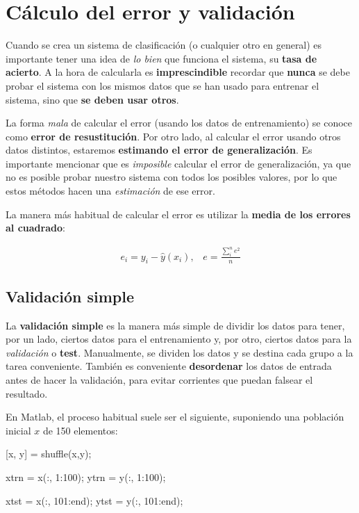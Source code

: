 \documentclass[11pt]{scrartcl}
\begin{document}
\section{Cálculo del error y validación}

Cuando se crea un sistema de clasificación (o cualquier otro en general) es
importante tener una idea de \textit{lo bien} que funciona el sistema, su
\textbf{tasa de acierto}. A la hora de calcularla es \textbf{imprescindible}
recordar que \textbf{nunca} se debe probar el sistema con los mismos datos que
se han usado para entrenar el sistema, sino que \textbf{se deben usar otros}.

La forma \textit{mala} de calcular el error (usando los datos de entrenamiento)
se conoce como \textbf{error de resustitución}. Por otro lado, al calcular el
error usando otros datos distintos, estaremos \textbf{estimando el error de
  generalización}. Es importante mencionar que es \textit{imposible} calcular el
error de generalización, ya que no es posible probar nuestro sistema con todos
los posibles valores, por lo que estos métodos hacen una \textit{estimación} de
ese error.

La manera más habitual de calcular el error es utilizar la \textbf{media de los errores
al cuadrado}:

\begin{align*}
e_i = y_i - \hat{y}(x_i), \;\;\;
e = \frac{\sum_{i}^{n} e^2} {n}  
\end{align*}

\subsection{Validación simple}

La \textbf{validación simple} es la manera más simple de dividir los datos para
tener, por un lado, ciertos datos para el entrenamiento y, por otro, ciertos
datos para la \textit{validación} o \textbf{test}. Manualmente, se dividen los
datos y se destina cada grupo a la tarea conveniente. También es conveniente
\textbf{desordenar} los datos de entrada antes de hacer la validación, para
evitar corrientes que puedan falsear el resultado. 

En Matlab, el proceso habitual suele ser el siguiente, suponiendo una población
inicial $x$ de 150 elementos:

\begin{matlabcode}
[x, y] = shuffle(x,y);  

xtrn = x(:, 1:100);
ytrn = y(:, 1:100);

xtst = x(:, 101:end);
ytst = y(:, 101:end);
\end{matlabcode}
\end{document}
